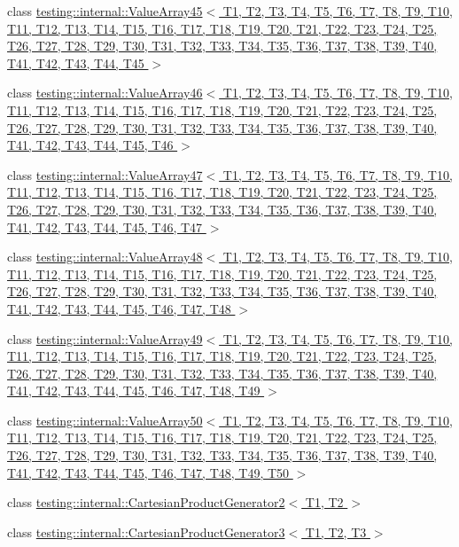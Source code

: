 \begin{DoxyCompactItemize}
\item 
class \hyperlink{classtesting_1_1internal_1_1_value_array45}{testing\-::internal\-::\-Value\-Array45$<$ T1, T2, T3, T4, T5, T6, T7, T8, T9, T10, T11, T12, T13, T14, T15, T16, T17, T18, T19, T20, T21, T22, T23, T24, T25, T26, T27, T28, T29, T30, T31, T32, T33, T34, T35, T36, T37, T38, T39, T40, T41, T42, T43, T44, T45 $>$}
\item 
class \hyperlink{classtesting_1_1internal_1_1_value_array46}{testing\-::internal\-::\-Value\-Array46$<$ T1, T2, T3, T4, T5, T6, T7, T8, T9, T10, T11, T12, T13, T14, T15, T16, T17, T18, T19, T20, T21, T22, T23, T24, T25, T26, T27, T28, T29, T30, T31, T32, T33, T34, T35, T36, T37, T38, T39, T40, T41, T42, T43, T44, T45, T46 $>$}
\item 
class \hyperlink{classtesting_1_1internal_1_1_value_array47}{testing\-::internal\-::\-Value\-Array47$<$ T1, T2, T3, T4, T5, T6, T7, T8, T9, T10, T11, T12, T13, T14, T15, T16, T17, T18, T19, T20, T21, T22, T23, T24, T25, T26, T27, T28, T29, T30, T31, T32, T33, T34, T35, T36, T37, T38, T39, T40, T41, T42, T43, T44, T45, T46, T47 $>$}
\item 
class \hyperlink{classtesting_1_1internal_1_1_value_array48}{testing\-::internal\-::\-Value\-Array48$<$ T1, T2, T3, T4, T5, T6, T7, T8, T9, T10, T11, T12, T13, T14, T15, T16, T17, T18, T19, T20, T21, T22, T23, T24, T25, T26, T27, T28, T29, T30, T31, T32, T33, T34, T35, T36, T37, T38, T39, T40, T41, T42, T43, T44, T45, T46, T47, T48 $>$}
\item 
class \hyperlink{classtesting_1_1internal_1_1_value_array49}{testing\-::internal\-::\-Value\-Array49$<$ T1, T2, T3, T4, T5, T6, T7, T8, T9, T10, T11, T12, T13, T14, T15, T16, T17, T18, T19, T20, T21, T22, T23, T24, T25, T26, T27, T28, T29, T30, T31, T32, T33, T34, T35, T36, T37, T38, T39, T40, T41, T42, T43, T44, T45, T46, T47, T48, T49 $>$}
\item 
class \hyperlink{classtesting_1_1internal_1_1_value_array50}{testing\-::internal\-::\-Value\-Array50$<$ T1, T2, T3, T4, T5, T6, T7, T8, T9, T10, T11, T12, T13, T14, T15, T16, T17, T18, T19, T20, T21, T22, T23, T24, T25, T26, T27, T28, T29, T30, T31, T32, T33, T34, T35, T36, T37, T38, T39, T40, T41, T42, T43, T44, T45, T46, T47, T48, T49, T50 $>$}
\item 
class \hyperlink{classtesting_1_1internal_1_1_cartesian_product_generator2}{testing\-::internal\-::\-Cartesian\-Product\-Generator2$<$ T1, T2 $>$}
\item 
class \hyperlink{classtesting_1_1internal_1_1_cartesian_product_generator3}{testing\-::internal\-::\-Cartesian\-Product\-Generator3$<$ T1, T2, T3 $>$}

\end{DoxyCompactItemize}
